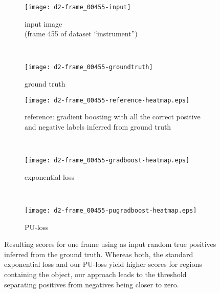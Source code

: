 \begin{figure}[ht]
	\centering
 	\begin{subfigure}[h]{0.48\textwidth}
	  \texttt{[image: d2-frame\_00455-input]}
	  \caption*{input image \\ (frame 455 of dataset ``instrument'')}
	\end{subfigure}
	~
	\begin{subfigure}[h]{0.48\textwidth}
	  \texttt{[image: d2-frame\_00455-groundtruth]}
	  \caption*{ground truth \\ \quad}
	\end{subfigure}
	
	\vspace{3mm}
	\begin{subfigure}[h]{0.48\textwidth}
	  \texttt{[image: d2-frame\_00455-reference-heatmap.eps]}
	  \caption*{reference: gradient boosting with all the correct positive and negative labels inferred from ground truth}	
	\end{subfigure}
	~
	\begin{subfigure}[h]{0.48\textwidth}
	  \texttt{[image: d2-frame\_00455-gradboost-heatmap.eps]}
	  \caption*{exponential loss \newline}
	\end{subfigure}	
	~
	\begin{subfigure}[h]{0.48\textwidth}
	  \texttt{[image: d2-frame\_00455-pugradboost-heatmap.eps]}
		  \caption*{PU-loss \\ }
	\end{subfigure}		
	\caption{Resulting scores for one frame using as input random true positives inferred from the ground truth. Whereas both, the standard exponential loss and our PU-loss yield higher scores for regions containing the object, our approach leads to the threshold separating positives from negatives being closer to zero.}
	\label{fig:bias-in-heatmaps}
\end{figure}

